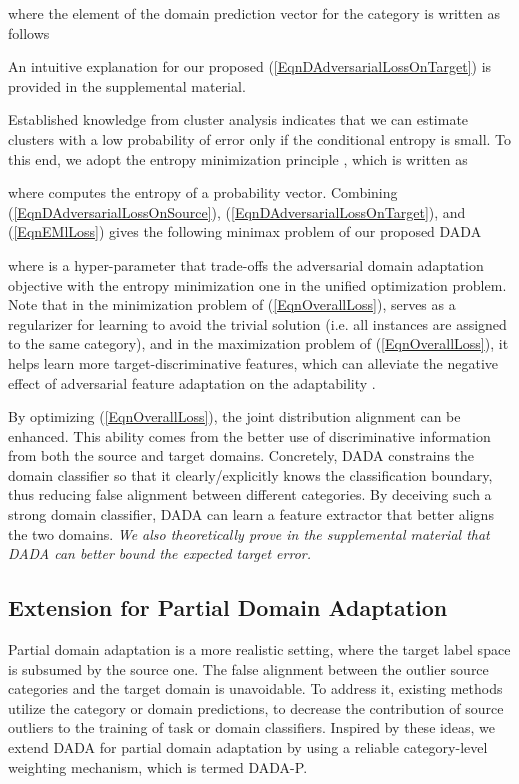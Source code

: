 \documentclass[letterpaper]{article} \usepackage{aaai20}  \usepackage{times}  \usepackage{helvet} \usepackage{courier}  \usepackage[hyphens]{url}  \usepackage{graphicx} \urlstyle{rm} \def\UrlFont{\rm}  \usepackage{graphicx}  \frenchspacing  \setlength{\pdfpagewidth}{8.5in}  \setlength{\pdfpageheight}{11in}
\begin{document}
where the  element of the domain prediction vector  for the  category is written as follows

An intuitive explanation for our proposed (\ref{EqnDAdversarialLossOnTarget}) is provided in the supplemental material.

Established knowledge from cluster analysis \cite{fano_ineq} indicates that we can estimate clusters with a low probability of error only if the conditional entropy is small. To this end, we adopt the entropy minimization principle \cite{em}, which is written as 

where  computes the entropy of a probability vector. Combining (\ref{EqnDAdversarialLossOnSource}), (\ref{EqnDAdversarialLossOnTarget}), and (\ref{EqnEMlLoss}) gives the following minimax problem of our proposed DADA 

where  is a hyper-parameter that trade-offs the adversarial domain adaptation objective with the entropy minimization one in the unified optimization problem. Note that in the minimization problem of (\ref{EqnOverallLoss}),  serves as a regularizer for learning  to avoid the trivial solution (i.e. all instances are assigned to the same category), and in the maximization problem of (\ref{EqnOverallLoss}), it helps learn more target-discriminative features, which can alleviate the negative effect of adversarial feature adaptation on the adaptability \cite{tat}.

By optimizing (\ref{EqnOverallLoss}), the joint distribution alignment can be enhanced. This ability comes from the better use of discriminative information from both the source and target domains. Concretely, DADA constrains the domain classifier so that it clearly/explicitly knows the classification boundary, thus reducing false alignment between different categories. By deceiving such a strong domain classifier, DADA can learn a feature extractor that better aligns the two domains. \emph{We also theoretically prove in the supplemental material that DADA can better bound the expected target error.}

\subsection{Extension for Partial Domain Adaptation}
Partial domain adaptation is a more realistic setting, where the target label space is subsumed by the source one. The false alignment between the outlier source categories and the target domain is unavoidable. To address it, existing methods \cite{san,iwan,pada} utilize the category or domain predictions, to decrease the contribution of source outliers to the training of task or domain classifiers. Inspired by these ideas, we extend DADA for partial domain adaptation by using a reliable category-level weighting mechanism, which is termed DADA-P. 
\end{document}
